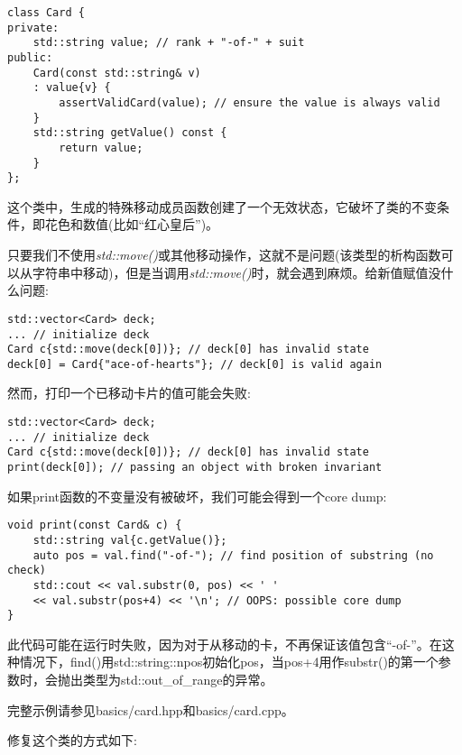 \begin{lstlisting}[caption={}]
class Card {
private:
	std::string value; // rank + "-of-" + suit
public:
	Card(const std::string& v)
	: value{v} {
		assertValidCard(value); // ensure the value is always valid
	}
	std::string getValue() const {
		return value;
	}
};
\end{lstlisting}

这个类中，生成的特殊移动成员函数创建了一个无效状态，它破坏了类的不变条件，即花色和数值(比如“红心皇后”)。\par

只要我们不使用\textit{std::move()}或其他移动操作，这就不是问题(该类型的析构函数可以从字符串中移动)，但是当调用\textit{std::move()}时，就会遇到麻烦。给新值赋值没什么问题:\par

\begin{lstlisting}[caption={}]
std::vector<Card> deck;
... // initialize deck
Card c{std::move(deck[0])}; // deck[0] has invalid state
deck[0] = Card{"ace-of-hearts"}; // deck[0] is valid again
\end{lstlisting}

然而，打印一个已移动卡片的值可能会失败:\par

\begin{lstlisting}[caption={}]
std::vector<Card> deck;
... // initialize deck
Card c{std::move(deck[0])}; // deck[0] has invalid state
print(deck[0]); // passing an object with broken invariant
\end{lstlisting}

如果print函数的不变量没有被破坏，我们可能会得到一个core dump:\par

\begin{lstlisting}[caption={}]
void print(const Card& c) {
	std::string val{c.getValue()};
	auto pos = val.find("-of-"); // find position of substring (no check)
	std::cout << val.substr(0, pos) << ' '
	<< val.substr(pos+4) << '\n'; // OOPS: possible core dump
}
\end{lstlisting}

此代码可能在运行时失败，因为对于从移动的卡，不再保证该值包含“-of-”。在这种情况下，find()用std::string::npos初始化pos，当pos+4用作substr()的第一个参数时，会抛出类型为std::out\_of\_range的异常。\par

完整示例请参见basics/card.hpp和basics/card.cpp。\par

修复这个类的方式如下:\par

